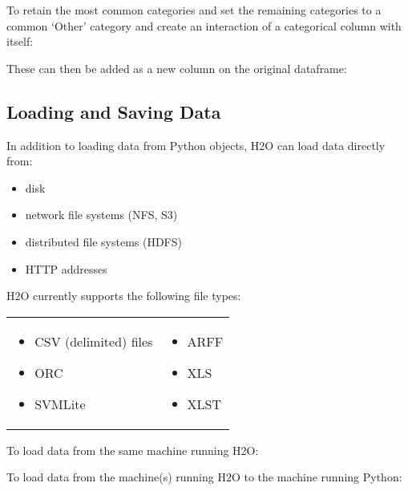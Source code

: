 {To retain the most common categories and set the remaining categories to a common `Other' category
 and create an interaction of a categorical column with itself:



These can then be added as a new column on the original dataframe:


\subsection{Loading and Saving Data}
In addition to loading data from Python objects, H2O can load data directly from:
\begin{itemize}
\item disk
\item network file systems (NFS, S3)
\item distributed file systems (HDFS)
\item HTTP addresses
\end{itemize}

 H2O currently supports the following file types:

\begin{frame}%

\begin{tabular}{p{5.5cm}p{5.5cm}}

\begin{itemize}
\item CSV (delimited) files
\item ORC
\item SVMLite
\end{itemize} &
\begin{itemize}
\item ARFF
\item XLS
\item XLST 
\end{itemize}
\end{tabular}
\end{frame}

To load data from the same machine running H2O:


To load data from the machine(s) running H2O to the machine running Python:


}
